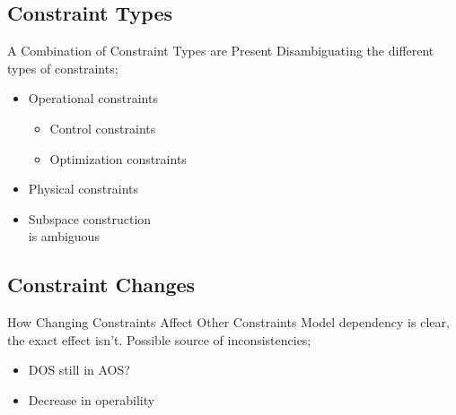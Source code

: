 \documentclass{beamer}
\begin{document}
\subsection{Constraint Types}

\begin{frame}{A Combination of Constraint Types are Present}
Disambiguating the different types of constraints;
\begin{figure}
\end{figure}

\begin{itemize}
  \item
    Operational constraints
    \begin{itemize}
      \item
        Control constraints
      \item
        Optimization constraints
    \end{itemize}
  \item
    Physical constraints
  \item
    Subspace construction \\ is ambiguous
\end{itemize}
\end{frame}


\subsection{Constraint Changes}

\begin{frame}{How Changing Constraints Affect Other Constraints}
Model dependency is clear, the exact effect isn't.
\vfill
Possible source of inconsistencies;
  \begin{itemize}
    \item
      DOS still in AOS?
    \item
      Decrease in operability
  \end{itemize}
\vfill
\end{frame}
\end{document}
